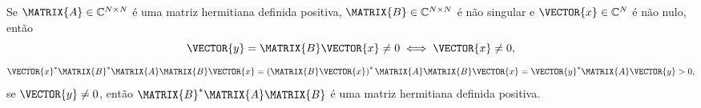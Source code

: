 \begin{myproofT}\label{proof:theo:prophermitianpositivematrix1:b}
Se $\MATRIX{A} \in \mathbb{C}^{N \times N}$ é uma matriz hermitiana definida positiva, 
$\MATRIX{B} \in \mathbb{C}^{N \times N}$ é não singular e
$\VECTOR{x} \in \mathbb{C}^{N}$ é não nulo, então
\begin{equation}
\VECTOR{y}=\MATRIX{B}\VECTOR{x}\neq 0 \iff \VECTOR{x}\neq 0,
\end{equation}
\begin{equation}
\VECTOR{x}^{\ast} \MATRIX{B}^{\ast} \MATRIX{A} \MATRIX{B} \VECTOR{x} =
\left(\MATRIX{B}\VECTOR{x}\right)^{\ast} \MATRIX{A} \MATRIX{B} \VECTOR{x} =
\VECTOR{y}^{\ast} \MATRIX{A} \VECTOR{y}>0,
\end{equation}
se $\VECTOR{y}\neq 0$, então $\MATRIX{B}^{\ast} \MATRIX{A} \MATRIX{B}$
é uma matriz hermitiana definida positiva.
\end{myproofT}


